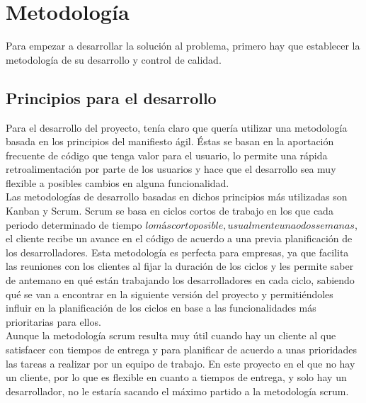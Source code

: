 \chapter{Metodología}\label{chap:metodología}
Para empezar a desarrollar la solución al problema, primero hay que establecer la metodología de su desarrollo y
control de calidad.\\

\section{Principios para el desarrollo}
Para el desarrollo del proyecto, tenía claro que quería utilizar una metodología basada en los principios del
manifiesto ágil\cite{agile}. Éstas se basan en la aportación frecuente de código que tenga valor para el usuario, lo
permite una rápida retroalimentación por parte de los usuarios y hace que el desarrollo sea muy flexible a posibles
cambios en alguna funcionalidad.\\

Las metodologías de desarrollo basadas en dichos principios más utilizadas son Kanban\cite{kanban} y Scrum\cite{scrum}.
Scrum se basa en ciclos cortos de trabajo en los que cada periodo determinado de tiempo \(lo más corto posible,
usualmente una o dos semanas\), el cliente recibe un avance en el código de acuerdo a una previa planificación de los
desarrolladores. Esta metodología es perfecta para empresas, ya que facilita las reuniones con los clientes al fijar la
duración de los ciclos y les permite saber de antemano en qué están trabajando los desarrolladores en cada ciclo,
sabiendo qué se van a encontrar en la siguiente versión del proyecto y permitiéndoles influir en la planificación de
los ciclos en base a las funcionalidades más prioritarias para ellos.\\

Aunque la metodología scrum resulta muy útil cuando hay un cliente al que satisfacer con tiempos de entrega y para
planificar de acuerdo a unas prioridades las tareas a realizar por un equipo de trabajo. En este proyecto en el que no
hay un cliente, por lo que es flexible en cuanto a tiempos de entrega, y solo hay un desarrollador, no le estaría
sacando el máximo partido a la metodología scrum.\\

